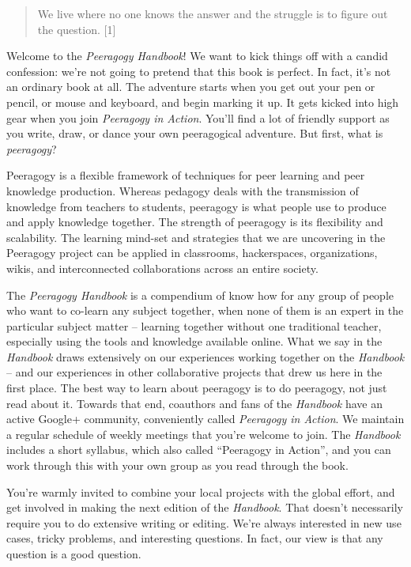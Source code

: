\begin{quote}
We live where no one knows the answer and the struggle is to figure out
the question. {{[}1{]}}
\end{quote}

Welcome to the \emph{Peeragogy Handbook}! We want to kick things off
with a candid confession: we're not going to pretend that this book is
perfect. In fact, it's not an ordinary book at all. The adventure starts
when you get out your pen or pencil, or mouse and keyboard, and begin
marking it up. It gets kicked into high gear when you join
\emph{Peeragogy in Action}. You'll find a lot of friendly support as you
write, draw, or dance your own peeragogical adventure. But first, what
is \emph{peeragogy}?

Peeragogy is a flexible framework of techniques for peer learning and
peer knowledge production. Whereas pedagogy deals with the transmission
of knowledge from teachers to students, peeragogy is what people use to
produce and apply knowledge together. The strength of peeragogy is its
flexibility and scalability. The learning mind-set and strategies that
we are uncovering in the Peeragogy project can be applied in classrooms,
hackerspaces, organizations, wikis, and interconnected collaborations
across an entire society.

The \emph{Peeragogy Handbook} is a compendium of know how for any group
of people who want to co-learn any subject together, when none of them
is an expert in the particular subject matter -- learning together
without one traditional teacher, especially using the tools and
knowledge available online. What we say in the \emph{Handbook} draws
extensively on our experiences working together on the \emph{Handbook}
-- and our experiences in other collaborative projects that drew us here
in the first place. The best way to learn about peeragogy is to do
peeragogy, not just read about it. Towards that end, coauthors and fans
of the \emph{Handbook} have an active Google+ community, conveniently
called \emph{Peeragogy in Action}. We maintain a regular schedule of
weekly meetings that you're welcome to join. The \emph{Handbook}
includes a short syllabus, which also called ``Peeragogy in Action'',
and you can work through this with your own group as you read through
the book.

You're warmly invited to combine your local projects with the global
effort, and get involved in making the next edition of the
\emph{Handbook}. That doesn't necessarily require you to do extensive
writing or editing. We're always interested in new use cases, tricky
problems, and interesting questions. In fact, our view is that any
question is a good question.

